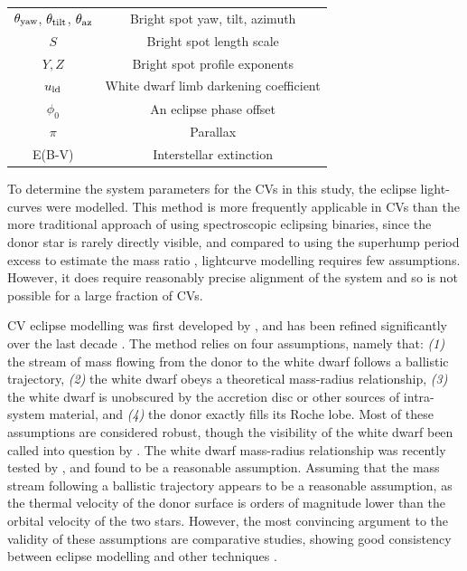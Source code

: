 \begin{table}
\begin{tabular}{cc}
        $\theta_{\rm yaw}$, $\theta_{\rm tilt}$, $\theta_{\rm az}$      & Bright spot yaw, tilt, azimuth                          \\
        $S$                                                             & Bright spot length scale                                \\
        $Y, Z$                                                          & Bright spot profile exponents                           \\
        $u_{\rm ld}$                                                    & White dwarf limb darkening coefficient                  \\
        $\phi_0$                                                        & An eclipse phase offset                                 \\
        $\pi$                                                           & Parallax                                                \\
        E(B-V)                                                          & Interstellar extinction   \\

        \hline
    \end{tabular}
\end{table}

To determine the system parameters for the CVs in this study, the eclipse light-curves were modelled. This method is more frequently applicable in CVs than the more traditional approach of using spectroscopic eclipsing binaries, since the donor star is rarely directly visible, and compared to using the superhump period excess to estimate the mass ratio \citep{patterson2005, knigge2006}, lightcurve modelling requires few assumptions. However, it does require reasonably precise alignment of the system and so is not possible for a large fraction of CVs.

CV eclipse modelling was first developed by \citet{wood1986}, and has been refined significantly over the last decade \citep{Savoury2011, littlefair2014, McAllister2017, McAllister2019}. The method relies on four assumptions, namely that: \textit{(1)} the stream of mass flowing from the donor to the white dwarf follows a ballistic trajectory, \textit{(2)} the white dwarf obeys a theoretical mass-radius relationship, \textit{(3)} the white dwarf is unobscured by the accretion disc or other sources of intra-system material, and \textit{(4)} the donor exactly fills its Roche lobe.
Most of these assumptions are considered robust, though the visibility of the white dwarf been called into question by \citet{Spark2015}.
The white dwarf mass-radius relationship was recently tested by \citet{parsons2017}, and found to be a reasonable assumption.
Assuming that the mass stream following a ballistic trajectory appears to be a reasonable assumption, as the thermal velocity of the donor surface is orders of magnitude lower than the orbital velocity of the two stars.
However, the most convincing argument to the validity of these assumptions are comparative studies, showing good consistency between eclipse modelling and other techniques \citep{tulloch2009,copperwheat2012,savoury2012}.

